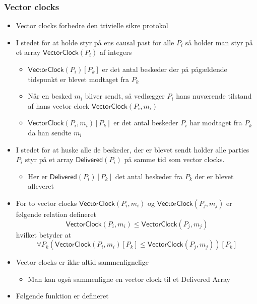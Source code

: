 \documentclass[a4, english]{article}
\begin{document}
\subsubsection{Vector clocks}
\begin{itemize}
	\item Vector clocks forbedre den trivielle sikre protokol
  \item I stedet for at holde styr på ens causal past for alle $P_i$ så holder man styr på et array $\mathsf{VectorClock}(P_i)$ af integers
  \begin{itemize}
  	\item $\mathsf{VectorClock}(P_i)[P_k]$ er det antal beskeder der på pågældende tidspunkt er blevet modtaget fra $P_k$
    \item Når en besked $m_i$ bliver sendt, så vedlægger $P_i$ hans nuværende tilstand af hans vector clock $\mathsf{VectorClock}(P_i,m_i)$
    \item $\mathsf{VectorClock}(P_i,m_i)[P_k]$ er det antal beskeder $P_i$ har modtaget fra $P_k$ da han sendte $m_i$
  \end{itemize}
  \item I stedet for at huske alle de beskeder, der er blevet sendt holder alle parties $P_i$ styr på et array $\mathsf{Delivered}(P_i)$ på samme tid som vector clocks. 
  \begin{itemize}
  	\item Her er $\mathsf{Delivered}(P_i)[P_k]$ det antal beskeder fra $P_k$ der er blevet afleveret
  \end{itemize}
  \item For to vector clocks $\mathsf{VectorClock}(P_i,m_i)$ og $\mathsf{VectorClock}(P_j,m_j)$ er følgende relation defineret
\begin{equation*}
  \mathsf{VectorClock}(P_i,m_i) \leq \mathsf{VectorClock}(P_j,m_j)
\end{equation*}
hvilket betyder at 
\begin{equation*}
  \forall P_k (\mathsf{VectorClock}(P_i,m_i)[P_k] \leq \mathsf{VectorClock}(P_j,m_j))[P_k]
\end{equation*}
  \item Vector clocks er ikke altid sammenlignelige 
  \begin{itemize}
  	\item Man kan også sammenligne en vector clock til et Delivered Array
  \end{itemize}  
  \item Følgende funktion er defineret 
  \begin{equation*}

\end{equation*}
\end{itemize}
\end{document}
